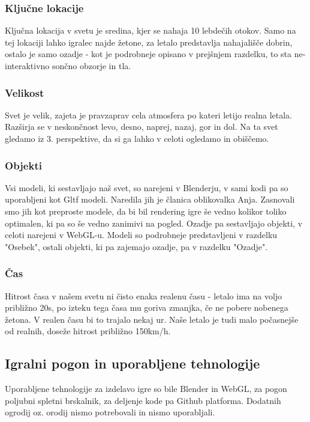 \documentclass[a4paper]{article}
\begin{document}
\subsubsection{Ključne lokacije}%
Ključna lokacija v svetu je sredina, kjer se nahaja 10 lebdečih otokov. Samo na tej lokaciji lahko igralec najde žetone, za letalo predstavlja nahajališče dobrin, ostalo je samo ozadje - kot je podrobneje opisano v prejšnjem razdelku, to sta ne-interaktivno sončno obzorje in tla.

\subsubsection{Velikost}%
Svet je velik, zajeta je pravzaprav cela atmosfera po kateri letijo realna letala. Razširja se v neskončnost levo, desno, naprej, nazaj, gor in dol. Na ta svet gledamo iz 3. perspektive, da si ga lahko v celoti ogledamo in obiščemo. 

\subsubsection{Objekti}%
Vsi modeli, ki sestavljajo naš svet, so narejeni v Blenderju, v sami kodi pa so uporabljeni kot Gltf modeli. Naredila jih je članica oblikovalka Anja. Zasnovali smo jih kot preproste modele, da bi bil rendering igre še vedno kolikor toliko optimalen, ki pa so še vedno zanimivi na pogled. Ozadje pa sestavljajo objekti, v celoti narejeni v WebGL-u. Modeli so podrobneje predstavljeni v razdelku "Osebek", ostali objekti, ki pa zajemajo ozadje, pa v razdelku "Ozadje". 

\subsubsection{Čas}%
Hitrost časa v našem svetu ni čisto enaka realenu času - letalo ima na voljo približno 20s, po izteku tega časa mu goriva zmanjka, če ne pobere nobenega žetona. V realen času bi to trajalo nekaj ur. Naše letalo je tudi malo počasnejše od realnih, doseže hitrost približno 150km/h.

\subsection{Igralni pogon in uporabljene tehnologije}%
Uporabljene tehnologije za izdelavo igre so bile Blender in WebGL, za pogon poljubni spletni brskalnik, za deljenje kode pa Github platforma. Dodatnih ogrodij oz. orodij nismo potrebovali in nismo uporabljali.
\end{document}
